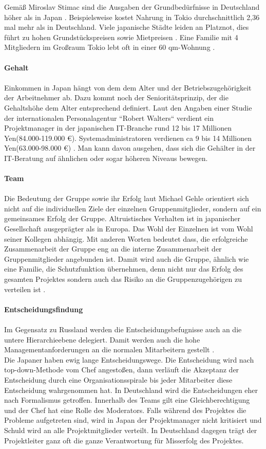 		Gemäß Miroslav Stimac sind die Ausgaben der Grundbedürfnisse in Deutschland höher als in Japan \cite[101]{Stimac2004}.
		Beispielsweise kostet Nahrung in Tokio durchschnittlich 2,36 mal mehr als in Deutschland. Viele japanische Städte leiden an Platznot, dies führt zu hohen Grundstückspreisen sowie Mietpreisen \cite[105]{Stimac2004}.
		Eine Familie mit 4 Mitgliedern im Großraum Tokio lebt oft in einer 60 qm-Wohnung \cite{ArbZeitJP}.\\	\\
		\textbf{Gehalt}\\ \\
		Einkommen in Japan hängt von dem dem Alter und der Betriebszugehörigkeit
		der Arbeitnehmer ab. Dazu kommt noch der Senioritätsprinzip, der die Gehaltshöhe dem Alter entsprechend definiert. Laut den Angaben  einer Studie der internationalen Personalagentur ``Robert Walters`` verdient ein Projektmanager in der japanischen IT-Branche rund 12 bis 17 Millionen Yen(84.000-119.000 €).
		Systemadministratoren verdienen ca 9 bis 14 Millionen Yen(63.000-98.000 €) \cite{EinkommenJP}.
		Man kann davon ausgehen, dass sich die Gehälter in der IT-Beratung auf ähnlichen oder sogar höheren Niveaus bewegen. \\ \\
			\textbf{Team}\\
			\\
		Die Bedeutung der Gruppe sowie ihr Erfolg laut Michael Gehle orientiert sich nicht auf die individuellen Ziele der	einzelnen Gruppenmitglieder, sondern auf ein gemeinsames Erfolg der Gruppe. Altruistisches Verhalten ist in japanischer Gesellschaft ausgeprägter als in Europa. Das Wohl der Einzelnen ist vom Wohl seiner Kollegen abhängig. Mit anderen Worten bedeutet dass, die erfolgreiche Zusammenarbeit der Gruppe eng an die interne Zusammenarbeit der Gruppenmitglieder angebunden  ist. Damit wird auch die Gruppe,  ähnlich wie eine Familie, die Schutzfunktion übernehmen, denn nicht nur das Erfolg des gesamten Projektes sondern auch das Risiko an die Gruppenzugehörigen zu verteilen ist \cite[233]{3LaenderVergl}.\\ \\
		\textbf{Entscheidungsfindung} \\ \\
		Im Gegensatz zu Russland werden die Entscheidungsbefugnisse auch an die untere Hierarchieebene delegiert. Damit werden auch die hohe Managementanforderungen  an die normalen Mitarbeitern gestellt \cite[233]{3LaenderVergl}.\\
		Die Japaner haben ewig lange Entscheidungswege. Die Entscheidung wird nach top-down-Methode vom Chef angestoßen, dann verläuft die Akzeptanz der Entscheidung durch eine Organisationsspirale bis jeder Mitarbeiter diese Entscheidung wahrgenommen hat. In Deutschland wird die Entscheidungen eher nach Formalismus getroffen. Innerhalb des Teams gilt eine Gleichberechtigung und der Chef hat eine Rolle des Moderators. Falls während des Projektes die Probleme aufgetreten sind, wird in Japan der Projektmanager nicht kritisiert und Schuld wird an alle Projektmitglieder verteilt. In Deutschland dagegen trägt der Projektleiter ganz oft die ganze Verantwortung für Misserfolg des Projektes.
